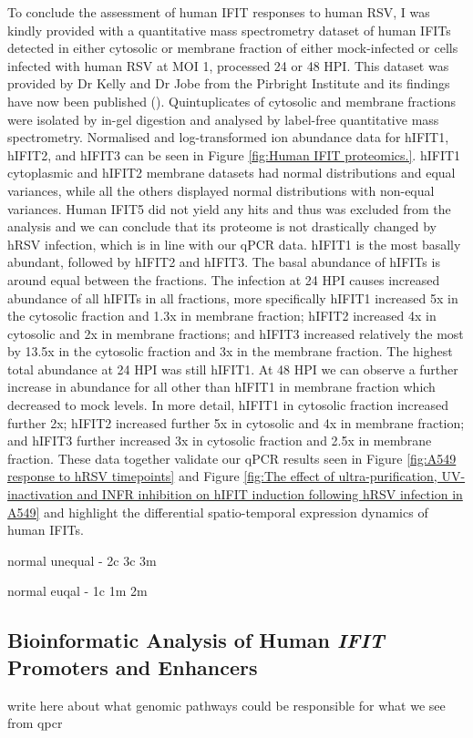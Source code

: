 To conclude the assessment of human IFIT responses to human RSV, I was kindly provided with a quantitative mass spectrometry dataset of human IFITs detected in either cytosolic or membrane fraction of either mock-infected or cells infected with human RSV at MOI 1, processed 24 or 48 HPI. This dataset was provided by Dr Kelly and Dr Jobe from the Pirbright Institute and its findings have now been published (\cite{Jobe2023ViralCondensates}). Quintuplicates of cytosolic and membrane fractions were isolated by in-gel digestion and analysed by label-free quantitative mass spectrometry. Normalised and log-transformed ion abundance data for hIFIT1, hIFIT2, and hIFIT3 can be seen in Figure \ref{fig:Human IFIT proteomics.}. hIFIT1 cytoplasmic and hIFIT2 membrane datasets had normal distributions and equal variances, while all the others displayed normal distributions with non-equal variances. Human IFIT5 did not yield any hits and thus was excluded from the analysis and we can conclude that its proteome is not drastically changed by hRSV infection, which is in line with our qPCR data. hIFIT1 is the most basally abundant, followed by hIFIT2 and hIFIT3. The basal abundance of hIFITs is around equal between the fractions. The infection at 24 HPI causes increased abundance of all hIFITs in all fractions, more specifically hIFIT1 increased 5x in the cytosolic fraction and 1.3x in membrane fraction; hIFIT2 increased 4x in cytosolic and 2x in membrane fractions; and hIFIT3 increased relatively the most by 13.5x in the cytosolic fraction and 3x in the membrane fraction. The highest total abundance at 24 HPI was still hIFIT1. At 48 HPI we can observe a further increase in abundance for all other than hIFIT1 in membrane fraction which decreased to mock levels. In more detail, hIFIT1 in cytosolic fraction increased further 2x; hIFIT2 increased further 5x in cytosolic and 4x in membrane fraction; and hIFIT3 further increased 3x in cytosolic fraction and 2.5x in membrane fraction. These data together validate our qPCR results seen in Figure \ref{fig:A549 response to hRSV timepoints} and Figure \ref{fig:The effect of ultra-purification, UV-inactivation and INFR inhibition on hIFIT induction following hRSV infection in A549} and highlight the differential spatio-temporal expression dynamics of human IFITs.

normal unequal - 2c 3c 3m

normal euqal - 1c 1m 2m 

\subsection{Bioinformatic Analysis of Human \textit{IFIT} Promoters and Enhancers} \label{subsec:Bioinformatic Analysis of Human \textit{IFIT} Promoters and Enhancers}
write here about what genomic pathways could be responsible for what we see from qpcr


